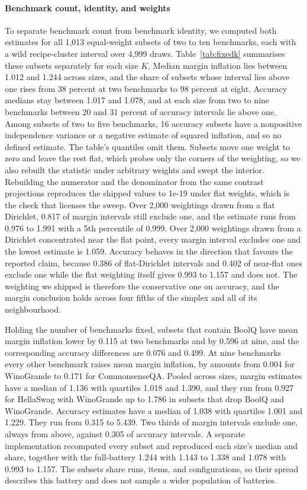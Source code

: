 \paragraph{Benchmark count, identity, and weights}
\label{app:composition}
To separate benchmark count from benchmark identity, we computed both estimates for all 1,013 equal-weight subsets of two to ten benchmarks, each with a wild recipe-cluster interval over 4,999 draws. Table~\ref{tab:fixedk} summarises these subsets separately for each size $K$. Median margin inflation lies between 1.012 and 1.244 across sizes, and the share of subsets whose interval lies above one rises from 38 percent at two benchmarks to 98 percent at eight. Accuracy medians stay between 1.017 and 1.078, and at each size from two to nine benchmarks between 20 and 31 percent of accuracy intervals lie above one. Among subsets of two to five benchmarks, 16 accuracy subsets have a nonpositive independence variance or a negative estimate of squared inflation, and so no defined estimate. The table's quantiles omit them. Subsets move one weight to zero and leave the rest flat, which probes only the corners of the weighting, so we also rebuilt the statistic under arbitrary weights and swept the interior. Rebuilding the numerator and the denominator from the same contrast projections reproduces the shipped values to 1e-19 under flat weights, which is the check that licenses the sweep. Over 2,000 weightings drawn from a flat Dirichlet, 0.817 of margin intervals still exclude one, and the estimate runs from 0.976 to 1.991 with a 5th percentile of 0.999. Over 2,000 weightings drawn from a Dirichlet concentrated near the flat point, every margin interval excludes one and the lowest estimate is 1.059. Accuracy behaves in the direction that favours the reported claim, because 0.386 of flat-Dirichlet intervals and 0.402 of near-flat ones exclude one while the flat weighting itself gives 0.993 to 1.157 and does not. The weighting we shipped is therefore the conservative one on accuracy, and the margin conclusion holds across four fifths of the simplex and all of its neighbourhood.

Holding the number of benchmarks fixed, subsets that contain BoolQ have mean margin inflation lower by 0.115 at two benchmarks and by 0.596 at nine, and the corresponding accuracy differences are 0.076 and 0.499. At nine benchmarks every other benchmark raises mean margin inflation, by amounts from 0.004 for WinoGrande to 0.171 for CommonsenseQA. Pooled across sizes, margin estimates have a median of 1.136 with quartiles 1.018 and 1.390, and they run from 0.927 for HellaSwag with WinoGrande up to 1.786 in subsets that drop BoolQ and WinoGrande. Accuracy estimates have a median of 1.038 with quartiles 1.001 and 1.229. They run from 0.315 to 5.439. Two thirds of margin intervals exclude one, always from above, against 0.305 of accuracy intervals. A separate implementation recomputed every subset and reproduced each size's median and share, together with the full-battery 1.244 with 1.143 to 1.338 and 1.078 with 0.993 to 1.157. The subsets share runs, items, and configurations, so their spread describes this battery and does not sample a wider population of batteries.

